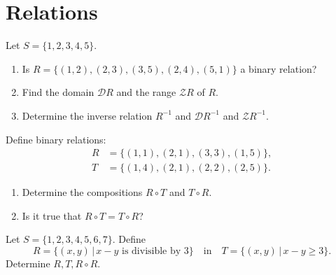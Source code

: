 \documentclass[11pt,paper=b5,footinclude,headinclude]{scrbook} %
\theoremstyle{remark}
\theoremstyle{definition} %
\theoremstyle{theorem} %
\newtheorem{ex}{Exercise\hypertarget{sol:\theex}}[chapter]
\begin{document}
\begin{ex}
\begin{sol}
\begin{enumerate}
\end{enumerate}


\end{sol}
\end{ex}

\chapter{Relations}


    
\begin{ex} 
Let $S=\{1,2,3,4,5\}$. 
\begin{enumerate}
    \item Is $R=\{(1,2),(2,3), (3,5), (2,4), (5,1)\}$ a binary relation?
    \item Find the domain $\mathcal{D} R$ and the range $\mathcal{Z} R$ of $R$.
    \item 
  Determine the inverse relation $R^{-1}$ and  $\mathcal{D} R^{-1}$ and  $\mathcal{Z} R^{-1}$.
\end{enumerate}

\end{ex}\begin{ex}
Define binary relations:
\begin{align*}
    R&=\{(1,1),(2,1), (3,3), (1,5)\},\\
    T&=\{(1,4),(2,1), (2,2), (2,5)\}.
\end{align*}
\begin{enumerate}
    \item 
Determine the compositions $R\circ T$ and $T\circ R$. 
\item Is it true that $R\circ T = T \circ R$?
\end{enumerate}

\end{ex}\begin{ex}
 Let  $S=\{1,2,3,4,5,6,7\}$. Define
$$R= \{(x,y)\,|\, x-y \textrm{ is divisible by  }  3\} \quad \mathrm{ in } \quad  T= \{(x,y)\,|\, x-y \geq 3\}.$$
Determine $R,T, R\circ R$.

\end{ex}
\end{document}
